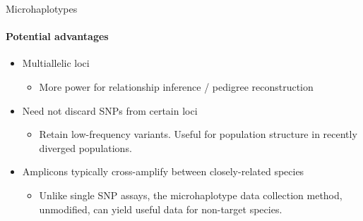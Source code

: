 \documentclass[letter,graphicx]{beamer}
\begin{document}
\begin{frame}{Microhaplotypes}
\framesubtitle{Potential advantages}
\begin{itemize}
\item Multiallelic loci
\begin{itemize}
\item More power for relationship inference / pedigree reconstruction
\end{itemize}
\item Need not discard SNPs from certain loci
\begin{itemize}
\item Retain low-frequency variants.  Useful for population structure in recently diverged populations.
\end{itemize}
\item Amplicons typically cross-amplify between closely-related species
\begin{itemize}
\item Unlike single SNP assays, the microhaplotype data collection method, unmodified,
can yield useful data for non-target species.
\end{itemize}
\end{itemize}
\end{frame}
\end{document}
